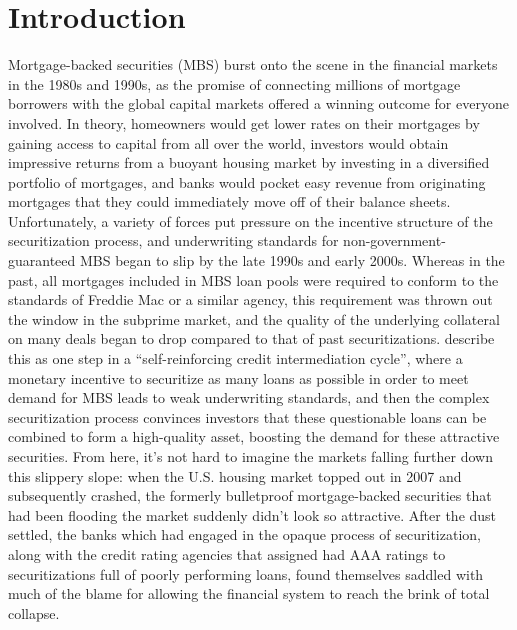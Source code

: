 \documentclass[12pt]{article}
\begin{document}
\section*{Introduction}
Mortgage-backed securities (MBS) burst onto the scene in the financial markets in the 1980s and 1990s, as the promise of connecting millions of mortgage borrowers with the global capital markets offered a winning outcome for everyone involved. In theory, homeowners would get lower rates on their mortgages by gaining access to capital from all over the world, investors would obtain impressive returns from a buoyant housing market by investing in a diversified portfolio of mortgages, and banks would pocket easy revenue from originating mortgages that they could immediately move off of their balance sheets. Unfortunately, a variety of forces put pressure on the incentive structure of the securitization process, and underwriting standards for non-government-guaranteed MBS began to slip by the late 1990s and early 2000s. Whereas in the past, all mortgages included in MBS loan pools were required to conform to the standards of Freddie Mac or a similar agency, this requirement was thrown out the window in the subprime market, and the quality of the underlying collateral on many deals began to drop compared to that of past securitizations. \textcite{segoviano13} describe this as one step in a “self-reinforcing credit intermediation cycle”, where a monetary incentive to securitize as many loans as possible in order to meet demand for MBS leads to weak underwriting standards, and then the complex securitization process convinces investors that these questionable loans can be combined to form a high-quality asset, boosting the demand for these attractive securities. From here, it’s not hard to imagine the markets falling further down this slippery slope: when the U.S. housing market topped out in 2007 and subsequently crashed, the formerly bulletproof mortgage-backed securities that had been flooding the market suddenly didn’t look so attractive. After the dust settled, the banks which had engaged in the opaque process of securitization, along with the credit rating agencies that assigned had AAA ratings to securitizations full of poorly performing loans, found themselves saddled with much of the blame for allowing the financial system to reach the brink of total collapse.
\end{document}
